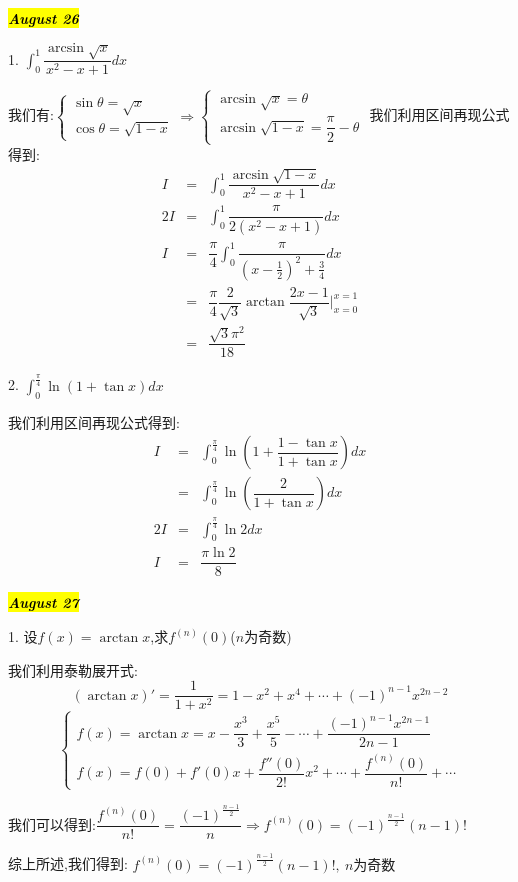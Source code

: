 \hl{\textbf{\textit{August 26}}}

1. $\int_{0}^{1}\dfrac{\arcsin\sqrt{x}}{x^2-x+1}dx$
\begin{solution}

	我们有:$\left\lbrace
	\begin{array}{l}
		\sin\theta=\sqrt{x}\\
		\cos\theta=\sqrt{1-x}
	\end{array}
	\right. \Rightarrow \left\lbrace
	\begin{array}{l}
		\arcsin\sqrt{x}=\theta\\
		\arcsin\sqrt{1-x}=\dfrac{\pi}{2}-\theta
	\end{array}
	\right. $
	我们利用区间再现公式得到:  
	\begin{eqnarray*}
		I&=&\int_{0}^{1}\dfrac{\arcsin\sqrt{1-x}}{x^2-x+1}dx\\
		2I&=&\int_{0}^{1}\dfrac{\pi}{2(x^2-x+1)}dx\\
		I&=&\dfrac{\pi}{4}\int_{0}^{1}\dfrac{\pi}{(x-\frac{1}{2})^2+\frac{3}{4}}dx\\
		&=&\dfrac{\pi}{4}\dfrac{2}{\sqrt{3}}\arctan\dfrac{2x-1}{\sqrt{3}}|_{x=0}^{x=1}\\
		&=&\dfrac{\sqrt{3}\pi^2}{18}
	\end{eqnarray*}
\end{solution}

2. $\int_{0}^{\frac{\pi}{4}}\ln(1+\tan x)dx$
\begin{solution}

	我们利用区间再现公式得到:
	\begin{eqnarray*}
		I&=&\int_{0}^{\frac{\pi}{4}}\ln(1+\dfrac{1-\tan x}{1+\tan x})dx\\
		&=&\int_{0}^{\frac{\pi}{4}}\ln(\dfrac{2}{1+\tan x})dx\\
		2I&=&\int_{0}^{\frac{\pi}{4}}\ln2dx\\
		I&=&\dfrac{\pi \ln2}{8}
	\end{eqnarray*}
\end{solution}

\hl{\textbf{\textit{August 27}}}

1. 设$f(x)=\arctan x$,求$f^{(n)}(0)$($n$为奇数)
\begin{solution}

	我们利用泰勒展开式:
	$$(\arctan x)'=\dfrac{1}{1+x^2}=1-x^2+x^4+\cdots+(-1)^{n-1}x^{2n-2}$$
	$$\left\lbrace
	\begin{array}{l}
		f(x)=\arctan x=x-\dfrac{x^3}{3}+\dfrac{x^5}{5}-\cdots+\dfrac{(-1)^{n-1}x^{2n-1}}{2n-1}\\
		f(x)=f(0)+f'(0)x+\dfrac{f''(0)}{2!}x^2+\cdots+\dfrac{f^{(n)}(0)}{n!}+\cdots
	\end{array}
	\right. $$
	
	我们可以得到:$\dfrac{f^{(n)}(0)}{n!}=\dfrac{(-1)^{\frac{n-1}{2}}}{n}\Rightarrow f^{(n)}(0)=(-1)^{\frac{n-1}{2}}(n-1)!$
		
	综上所述,我们得到:  $f^{(n)}(0)=(-1)^{\frac{n-1}{2}}(n-1)!,\ n\text{为奇数}$
\end{solution}

